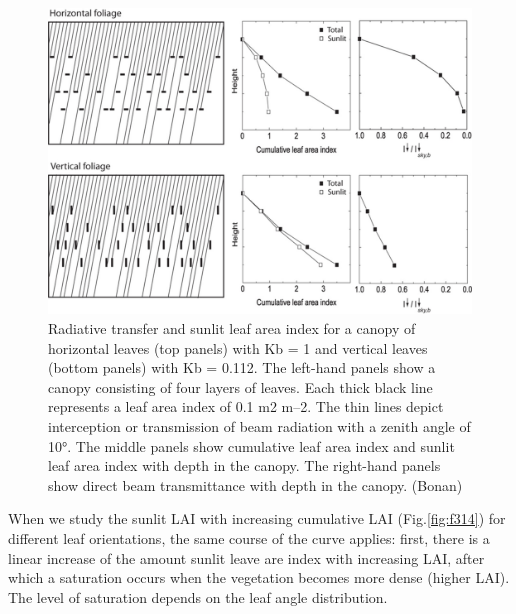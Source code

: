 \documentclass[12pt,oneside]{book}
\begin{document}
\begin{figure}

{\centering \includegraphics[width=0.8\linewidth]{figures/chap3/f313_sun_shade} 

}

\caption{Radiative transfer and sunlit leaf area index for a canopy of horizontal leaves (top panels) with Kb = 1 and vertical leaves (bottom panels) with Kb = 0.112. The left-hand panels show a canopy consisting of four layers of leaves. Each thick black line represents a leaf area index of 0.1 m2 m–2. The thin lines depict interception or transmission of beam radiation with a zenith angle of 10°. The middle panels show cumulative leaf area index and sunlit leaf area index with depth in the canopy. The right-hand panels show direct beam transmittance with depth in the canopy. (Bonan)}\label{fig:f313}
\end{figure}

When we study the sunlit LAI with increasing cumulative LAI
(Fig.\ref{fig:f314}) for different leaf orientations, the same course of
the curve applies: first, there is a linear increase of the amount
sunlit leave are index with increasing LAI, after which a saturation
occurs when the vegetation becomes more dense (higher LAI). The level of
saturation depends on the leaf angle distribution.
\end{document}
